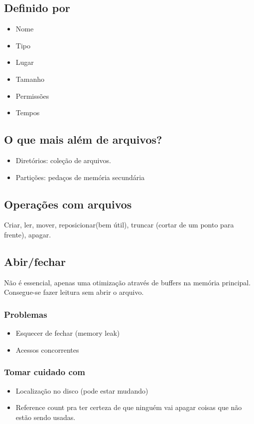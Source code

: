 \documentclass[11pt]{article}
\begin{document}
\subsection{Definido por}
\label{sec:orged7baef}
\begin{itemize}
\item Nome
\item Tipo
\item Lugar
\item Tamanho
\item Permissões
\item Tempos
\end{itemize}
\subsection{O que mais além de arquivos?}
\label{sec:org3a7edc9}
\begin{itemize}
\item Diretórios: coleção de arquivos.
\item Partições: pedaços de memória secundária
\end{itemize}
\subsection{Operações com arquivos}
\label{sec:orgbbc4828}
Criar, ler, mover, reposicionar(bem útil), truncar (cortar de um ponto para frente), apagar.
\subsection{Abir/fechar}
\label{sec:org3553f0d}
Não é essencial, apenas uma otimização através de buffers na memória
principal. Consegue-se fazer leitura sem abrir o arquivo.
\subsubsection{Problemas}
\label{sec:orge83d8d4}
\begin{itemize}
\item Esquecer de fechar (memory leak)
\item Acessos concorrentes
\end{itemize}
\subsubsection{Tomar cuidado com}
\label{sec:orgf44a715}
\begin{itemize}
\item Localização no disco (pode estar mudando)
\item Reference count pra ter certeza de que ninguém vai apagar coisas que não estão sendo
usadas.
\end{itemize}
\end{document}
